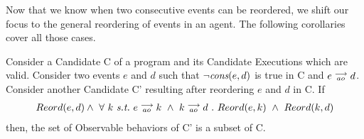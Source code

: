 Now that we know when two consecutive events can be reordered, we shift our focus to the general reordering of events in an agent. The following corollaries cover all those cases. 

\begin{corollary}
    \label{CorollReord}
    Consider a Candidate C of a program and its Candidate Executions which are valid. Consider two events $e$ and $d$ such that $\neg \textit{cons}(e,d)$ is true in C and $e\stackrel{\longrightarrow}{_{ao}}d$. 
    Consider another Candidate C' resulting after reordering $e$ and $d$ in C. 
    If
    \begin{align*}
        Reord(e,d) \wedge \ 
        \forall \ k \ \textit{s.t.} \ 
        \reln{e}{ao}{k} \ \wedge \ \reln{k}{ao}{d} \ . \ 
        Reord(e,k) \ \wedge \ Reord(k,d)    
    \end{align*}
    then, the set of Observable behaviors of C' is a subset of C. 
    \label{corol1}
\end{corollary}
    
